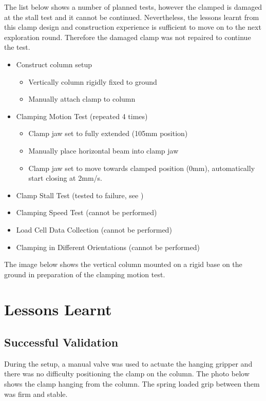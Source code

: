 The list below shows a number of planned tests, however the clamped is damaged at the stall test and it cannot be continued. Nevertheless, the lessons learnt from this clamp design and construction experience is sufficient to move on to the next exploration round. Therefore the damaged clamp was not repaired to continue the test.
\begin{itemize}
    \item Construct column setup
    \begin{itemize}
        \item Vertically column rigidly fixed to ground
        \item Manually attach clamp to column
    \end{itemize}
    \item Clamping Motion Test (repeated 4 times)
    \begin{itemize}
        \item Clamp jaw set to fully extended (105mm position)
        \item Manually place horizontal beam into clamp jaw 
        \item Clamp jaw set to move towards clamped position (0mm), automatically start closing at 2mm/s.
    \end{itemize}
    \item Clamp Stall Test (tested to failure, see )
    \item Clamping Speed Test (cannot be performed)
    \item Load Cell Data Collection (cannot be performed)
    \item Clamping in Different Orientations (cannot be performed)
\end{itemize}

    The image below shows the vertical column mounted on a rigid base on the ground in preparation of the clamping motion test.

\section{Lessons Learnt}
\label{section:exploration-1-lessions-learnt}

\subsection{Successful Validation}
\label{subsection:exploration-1-successful-validation}

During the setup, a manual valve was used to actuate the hanging gripper and there was no difficulty positioning the clamp on the column. The photo below shows the clamp hanging from the column. The spring loaded grip between them was firm and stable. 

